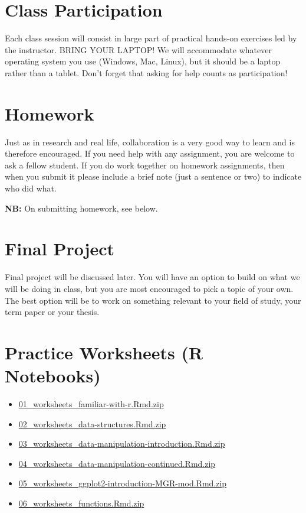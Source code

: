 \documentclass[
]{book}
\providecommand{\tightlist}{%
  \setlength{\itemsep}{0pt}\setlength{\parskip}{0pt}}
\begin{document}
\hypertarget{class-participation}{%
\section{Class Participation}\label{class-participation}}

Each class session will consist in large part of practical hands-on exercises led by the instructor. BRING YOUR LAPTOP! We will accommodate whatever operating system you use (Windows, Mac, Linux), but it should be a laptop rather than a tablet. Don't forget that asking for help counts as participation!

\hypertarget{homework}{%
\section{Homework}\label{homework}}

Just as in research and real life, collaboration is a very good way to learn and is therefore encouraged. If you need help with any assignment, you are welcome to ask a fellow student. If you do work together on homework assignments, then when you submit it please include a brief note (just a sentence or two) to indicate who did what.

\textbf{NB:} On submitting homework, see below.

\hypertarget{final-project}{%
\section{Final Project}\label{final-project}}

Final project will be discussed later. You will have an option to build on what we will be doing in class, but you are most encouraged to pick a topic of your own. The best option will be to work on something relevant to your field of study, your term paper or your thesis.

\hypertarget{practice-worksheets-r-notebooks}{%
\section{Practice Worksheets (R Notebooks)}\label{practice-worksheets-r-notebooks}}

\begin{itemize}
\tightlist
\item
  \href{./files/ws/01_worksheets_familiar-with-r.Rmd.zip}{01\_worksheets\_familiar-with-r.Rmd.zip}
\item
  \href{./files/ws/02_worksheets_data-structures.Rmd.zip}{02\_worksheets\_data-structures.Rmd.zip}
\item
  \href{./files/ws/03_worksheets_data-manipulation-introduction.Rmd.zip}{03\_worksheets\_data-manipulation-introduction.Rmd.zip}
\item
  \href{./files/ws/04_worksheets_data-manipulation-continued.Rmd.zip}{04\_worksheets\_data-manipulation-continued.Rmd.zip}
\item
  \href{./files/ws/05_worksheets_ggplot2-introduction-MGR-mod.Rmd.zip}{05\_worksheets\_ggplot2-introduction-MGR-mod.Rmd.zip}
\item
  \href{./files/ws/06_worksheets_functions.Rmd.zip}{06\_worksheets\_functions.Rmd.zip}
\end{itemize}
\end{document}

